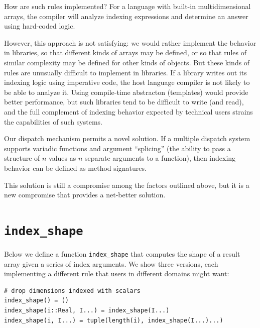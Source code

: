 \documentclass[preprint]{sigplanconf}
\begin{document}
How are such rules implemented? For a language with built-in multidimensional
arrays, the compiler will analyze indexing expressions and determine an answer
using hard-coded logic.


However, this approach is not satisfying: we would rather implement the
behavior in libraries, so that different kinds of arrays may be defined, or so
that rules of similar complexity may be defined for other kinds of objects.
But these kinds of rules are unusually difficult to implement in libraries. If
a library writes out its indexing logic using imperative code, the host
language compiler is not likely to be able to analyze it. Using compile-time
abstracton (templates) would provide better performance, but such libraries
tend to be difficult to write (and read), and the full complement of indexing
behavior expected by technical users strains the capabilities of such systems.


Our dispatch mechanism permits a novel solution. If a multiple dispatch system
supports variadic functions and argument ``splicing'' (the ability to pass a
structure of $n$ values as $n$ separate arguments to a function), then
indexing behavior can be defined as method signatures.

This solution is still a compromise among the factors outlined above, but it
is a new compromise that provides a net-better solution.


\section{\texttt{index\_shape}}

Below we define a function \texttt{index\_shape} that computes the shape of a
result array given a series of index arguments. We show three versions, each
implementing a different rule that users in different domains might want:


\begin{verbatim}
# drop dimensions indexed with scalars
index_shape() = ()
index_shape(i::Real, I...) = index_shape(I...)
index_shape(i, I...) = tuple(length(i), index_shape(I...)...)
\end{verbatim}
\end{document}
